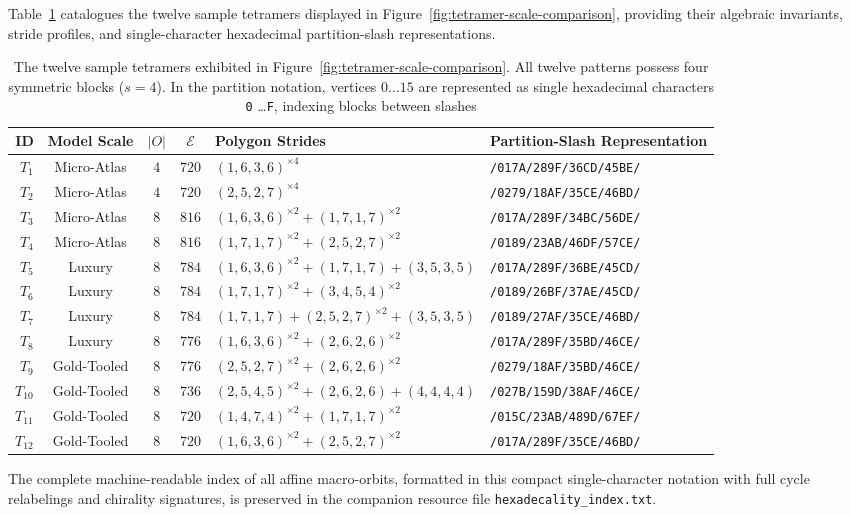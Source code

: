 Table~\ref{tab:exhibited-tetramers} catalogues the twelve sample tetramers displayed in Figure~\ref{fig:tetramer-scale-comparison}, providing their algebraic invariants, stride profiles, and single-character hexadecimal partition-slash representations.

\begin{table}[htbp]
\centering
\footnotesize
\setlength{\tabcolsep}{3.5pt}
\begin{tabular}{rcccll}
\toprule
\textbf{ID} & \textbf{Model Scale} & \textbf{$|O|$} & \textbf{$\mathcal{E}$} & \textbf{Polygon Strides} & \textbf{Partition-Slash Representation} \\
\midrule
$T_1$  & Micro-Atlas   & $4$ & $720$ & $(1,6,3,6)^{\times 4}$ & \texttt{/017A/289F/36CD/45BE/} \\
$T_2$  & Micro-Atlas   & $4$ & $720$ & $(2,5,2,7)^{\times 4}$ & \texttt{/0279/18AF/35CE/46BD/} \\
$T_3$  & Micro-Atlas   & $8$ & $816$ & $(1,6,3,6)^{\times 2} + (1,7,1,7)^{\times 2}$ & \texttt{/017A/289F/34BC/56DE/} \\
$T_4$  & Micro-Atlas   & $8$ & $816$ & $(1,7,1,7)^{\times 2} + (2,5,2,7)^{\times 2}$ & \texttt{/0189/23AB/46DF/57CE/} \\
\midrule
$T_5$  & Luxury        & $8$ & $784$ & $(1,6,3,6)^{\times 2} + (1,7,1,7) + (3,5,3,5)$ & \texttt{/017A/289F/36BE/45CD/} \\
$T_6$  & Luxury        & $8$ & $784$ & $(1,7,1,7)^{\times 2} + (3,4,5,4)^{\times 2}$ & \texttt{/0189/26BF/37AE/45CD/} \\
$T_7$  & Luxury        & $8$ & $784$ & $(1,7,1,7) + (2,5,2,7)^{\times 2} + (3,5,3,5)$ & \texttt{/0189/27AF/35CE/46BD/} \\
$T_8$  & Luxury        & $8$ & $776$ & $(1,6,3,6)^{\times 2} + (2,6,2,6)^{\times 2}$ & \texttt{/017A/289F/35BD/46CE/} \\
\midrule
$T_9$  & Gold-Tooled   & $8$ & $776$ & $(2,5,2,7)^{\times 2} + (2,6,2,6)^{\times 2}$ & \texttt{/0279/18AF/35BD/46CE/} \\
$T_{10}$ & Gold-Tooled & $8$ & $736$ & $(2,5,4,5)^{\times 2} + (2,6,2,6) + (4,4,4,4)$ & \texttt{/027B/159D/38AF/46CE/} \\
$T_{11}$ & Gold-Tooled & $8$ & $720$ & $(1,4,7,4)^{\times 2} + (1,7,1,7)^{\times 2}$ & \texttt{/015C/23AB/489D/67EF/} \\
$T_{12}$ & Gold-Tooled & $8$ & $720$ & $(1,6,3,6)^{\times 2} + (2,5,2,7)^{\times 2}$ & \texttt{/017A/289F/35CE/46BD/} \\
\bottomrule
\end{tabular}
\caption{\label{tab:exhibited-tetramers}The twelve sample tetramers exhibited in Figure~\ref{fig:tetramer-scale-comparison}. All twelve patterns possess four symmetric blocks ($s = 4$). In the partition notation, vertices $0 \dots 15$ are represented as single hexadecimal characters \texttt{0} \dots \texttt{F}, indexing blocks between slashes}
\end{table}

The complete machine-readable index of all affine macro-orbits, formatted in this compact single-character notation with full cycle relabelings and chirality signatures, is preserved in the companion resource file \texttt{hexadecality\_index.txt}.
